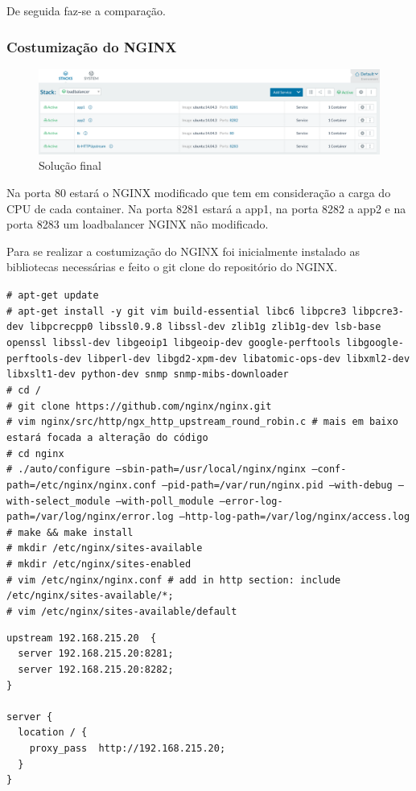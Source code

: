 \documentclass[pdftex,12pt,a4paper]{report}
\newcommand{\shellcmd}[1]{\indent\indent\texttt{\footnotesize\# #1}\\}
\begin{document}
De seguida faz-se a comparação.

\newpage

\subsubsection{Costumização do NGINX}

\begin{figure}[!htb]
\center
 \includegraphics[width=130mm,scale=1]{imagens/app-list.png}
 \caption{Solução final}
 \label{fig:dashboard}
\end{figure}

Na porta 80 estará o NGINX modificado que tem em consideração a carga do CPU de cada container. Na porta 8281 estará a app1, na porta 8282 a app2 e na porta 8283 um loadbalancer NGINX não modificado.

Para se realizar a costumização do NGINX foi inicialmente instalado as bibliotecas necessárias  e feito o git clone do repositório do NGINX.

\shellcmd{apt-get update}
\shellcmd{apt-get install -y git vim build-essential libc6 libpcre3 libpcre3-dev
libpcrecpp0 libssl0.9.8 libssl-dev zlib1g zlib1g-dev lsb-base openssl libssl-dev
libgeoip1 libgeoip-dev  google-perftools libgoogle-perftools-dev libperl-dev
libgd2-xpm-dev libatomic-ops-dev libxml2-dev libxslt1-dev python-dev 
snmp snmp-mibs-downloader}
\shellcmd{cd /}
\shellcmd{git clone https://github.com/nginx/nginx.git}
\shellcmd{vim nginx/src/http/ngx\_http\_upstream\_round\_robin.c 
\# mais em baixo estará focada a alteração do código}
\shellcmd{cd nginx}
\shellcmd{./auto/configure 
--sbin-path=/usr/local/nginx/nginx  
--conf-path=/etc/nginx/nginx.conf 
--pid-path=/var/run/nginx.pid 
--with-debug  --with-select\_module 
--with-poll\_module 
--error-log-path=/var/log/nginx/error.log 
--http-log-path=/var/log/nginx/access.log}
\shellcmd{make \&\& make install}
\shellcmd{mkdir /etc/nginx/sites-available}
\shellcmd{mkdir /etc/nginx/sites-enabled}
\shellcmd{vim /etc/nginx/nginx.conf \# add in http 
section: include /etc/nginx/sites-available/*;}
\shellcmd{vim /etc/nginx/sites-available/default}

\begin{lstlisting}
upstream 192.168.215.20  {
  server 192.168.215.20:8281;
  server 192.168.215.20:8282;
}

server {
  location / {
    proxy_pass  http://192.168.215.20;
  }
}
\end{lstlisting}
\end{document}
